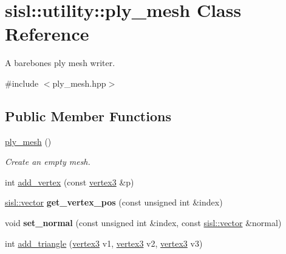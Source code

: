 \hypertarget{classsisl_1_1utility_1_1ply__mesh}{}\section{sisl\+:\+:utility\+:\+:ply\+\_\+mesh Class Reference}
\label{classsisl_1_1utility_1_1ply__mesh}


A barebones ply mesh writer.  




{\ttfamily \#include $<$ply\+\_\+mesh.\+hpp$>$}

\subsection*{Public Member Functions}
\begin{DoxyCompactItemize}
\item 
\mbox{\label{classsisl_1_1utility_1_1ply__mesh_ae9183ada87112161dd0a77b69ab7ce40}} 
\hyperlink{classsisl_1_1utility_1_1ply__mesh_ae9183ada87112161dd0a77b69ab7ce40}{ply\+\_\+mesh} ()
\begin{DoxyCompactList}\small\item\em Create an empty mesh. \end{DoxyCompactList}\item 
int \hyperlink{classsisl_1_1utility_1_1ply__mesh_a133740c648ea0dfcc71b79f0c4737ca4}{add\+\_\+vertex} (const \hyperlink{structsisl_1_1vertex3}{vertex3} \&p)
\item 
\mbox{\label{classsisl_1_1utility_1_1ply__mesh_a6ebea0a3ed87fc61bac43905cbf6433a}} 
\hyperlink{namespacesisl_a2069bd5374a9be042ff3ce3306d41e1a}{sisl\+::vector} {\bfseries get\+\_\+vertex\+\_\+pos} (const unsigned int \&index)
\item 
\mbox{\label{classsisl_1_1utility_1_1ply__mesh_a1c2ac4284e2a45d601e1f9d504fc9955}} 
void {\bfseries set\+\_\+normal} (const unsigned int \&index, const \hyperlink{namespacesisl_a2069bd5374a9be042ff3ce3306d41e1a}{sisl\+::vector} \&normal)
\item 
int \hyperlink{classsisl_1_1utility_1_1ply__mesh_a70f823f9e4642b7bd58af145c097cfb3}{add\+\_\+triangle} (\hyperlink{structsisl_1_1vertex3}{vertex3} v1, \hyperlink{structsisl_1_1vertex3}{vertex3} v2, \hyperlink{structsisl_1_1vertex3}{vertex3} v3)

\end{DoxyCompactItemize}
